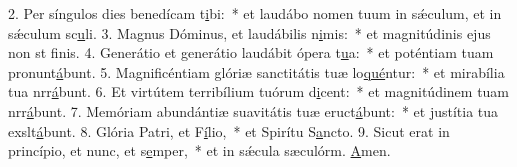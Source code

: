 2. Per síngulos dies benedícam t\uline{i}bi:~* et laudábo nomen tuum in sǽculum, et in sǽculum sc\uline{u}li.
3. Magnus Dóminus, et laudábilis n\uline{i}mis:~* et magnitúdinis ejus non st f\uline{i}nis.
4. Generátio et generátio laudábit ópera t\uline{u}a:~* et poténtiam tuam pronunt\uline{á}bunt.
5. Magnificéntiam glóriæ sanctitátis tuæ lo\uline{qué}ntur:~* et mirabília tua nrr\uline{á}bunt.
6. Et virtútem terribílium tuórum d\uline{i}cent:~* et magnitúdinem tuam nrr\uline{á}bunt.
7. Memóriam abundántiæ suavitátis tuæ eruct\uline{á}bunt:~* et justítia tua exslt\uline{á}bunt.
8. Glória Patri, et F\uline{í}lio,~* et Spirítu S\uline{a}ncto.
9. Sicut erat in princípio, et nunc, et s\uline{e}mper,~* et in sǽcula sæculórm. \uline{A}men.
